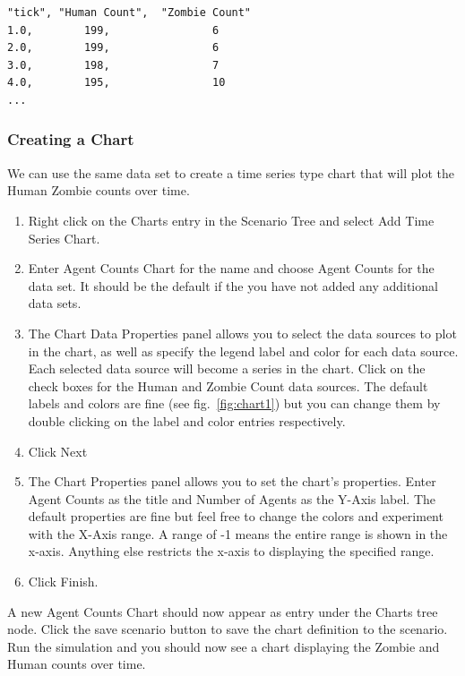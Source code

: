 \documentclass[11pt]{amsart}
\begin{document}
\noindent\begin{minipage}[h]{\textwidth}
\vspace{.2in}
\lstset{language=java,caption=Zombie Model Output}
\begin{lstlisting}
"tick",	"Human Count",	"Zombie Count"
1.0,		199,				6
2.0,		199,				6
3.0,		198,				7
4.0,		195,				10
...
\end{lstlisting}
\vspace{.2in}
\end{minipage}

\subsubsection{Creating a Chart} 
We can use the same data set to create a time series type chart that will plot the Human Zombie counts over time. 

\vspace{.2in}
\begin{enumerate}
\item Right click on the Charts entry in the Scenario Tree and select Add Time Series Chart.
\item Enter Agent Counts Chart for the name and choose Agent Counts for the data set. It should be the default if the you have not added any additional data sets.
\item The Chart Data Properties panel allows you to select the data sources to plot in the chart, as well as specify the legend label and color for each data source. Each selected data source will become a series in the chart. Click on the check boxes for the Human and Zombie Count data sources. The default labels and colors are fine (see fig.~\ref{fig:chart1}) but you can change them by double clicking on the label and color entries respectively.
\item Click Next
\item The Chart Properties panel allows you to set the chart's properties. Enter Agent Counts as the title and Number of Agents as the Y-Axis label. The default properties are fine but feel free to change the colors and experiment with the X-Axis range. A range of -1 means the entire range is shown in the x-axis. Anything else restricts the x-axis to displaying the specified range.
\item Click Finish.
\end{enumerate}
\vspace{.2in}

A new Agent Counts Chart should now appear as entry under the Charts tree node. Click the save scenario button to save the chart definition to the scenario. Run the simulation and you should now see a chart displaying the Zombie and Human counts over time.
\end{document}
